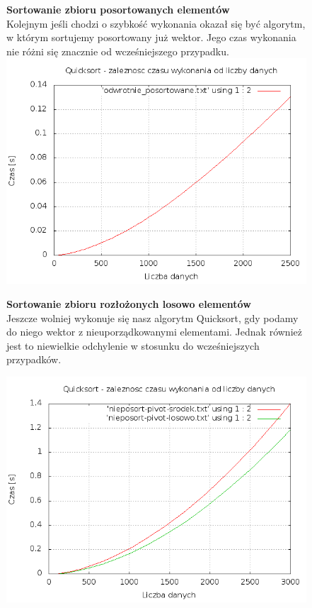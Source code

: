 \documentclass[a4paper,11pt]{report}
\begin{document}
\begin{figure}
  \begin{center}
  \textbf{Sortowanie zbioru posortowanych elementów}
\\Kolejnym jeśli chodzi o szybkość wykonania okazał się być algorytm, w którym sortujemy posortowany już wektor. Jego czas wykonania nie różni się znacznie od wcześniejszego przypadku.
\\
\includegraphics[scale=0.5]{./posortowane.png}
  \end{center}
\end{figure}

\begin{figure}
  \begin{center}
  \textbf{Sortowanie zbioru rozłożonych losowo elementów}
\\
Jeszcze wolniej wykonuje się nasz algorytm Quicksort, gdy podamy do niego wektor z nieuporządkowanymi elementami. Jednak również jest to niewielkie odchylenie w stosunku do wcześniejszych przypadków.

    \includegraphics[scale=0.5]{./nieposotrowane.png}
    \label{fig:}
  \end{center}
\end{figure}
\end{document}
